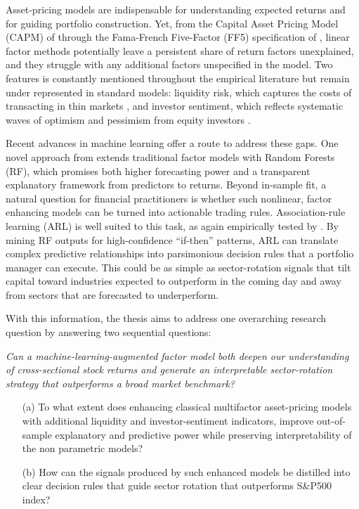 Asset-pricing models are indispensable for understanding expected returns and for guiding portfolio construction. Yet, from the Capital Asset Pricing Model (CAPM) of  through the Fama-French Five-Factor (FF5) specification of , linear factor methods potentially leave a persistent share of return factors unexplained, and they struggle with any additional factors unspecified in the model. Two features is constantly mentioned throughout the empirical literature but remain under represented in standard models: liquidity risk, which captures the costs of transacting in thin markets \cite{pastor_2003,acharya_2005}, and investor sentiment, which reflects systematic waves of optimism and pessimism from equity investors \cite{baker_wurgler_2006}.

Recent advances in machine learning offer a route to address these gaps. One novel approach from  extends traditional factor models with Random Forests (RF), which promises both higher forecasting power and a transparent explanatory framework from predictors to returns. Beyond in-sample fit, a natural question for financial practitioners is whether such nonlinear, factor enhancing models can be turned into actionable trading rules. Association-rule learning (ARL) is well suited to this task, as again empirically tested by . By mining RF outputs for high-confidence “if-then” patterns, ARL can translate complex predictive relationships into parsimonious decision rules that a portfolio manager can execute. This could be as simple as sector-rotation signals that tilt capital toward industries expected to outperform in the coming day and away from sectors that are forecasted to underperform.

\bigskip
\noindent
With this information, the thesis aims to address one overarching research question by answering two sequential questions:

\textit{Can a machine-learning-augmented factor model both deepen our understanding of cross-sectional stock returns and generate an interpretable sector-rotation strategy that outperforms a broad market benchmark?}

\begin{enumerate}
   \item[(a)] To what extent does enhancing classical multifactor asset-pricing models with additional liquidity and investor-sentiment indicators, improve out-of-sample explanatory and predictive power while preserving interpretability of the non parametric models?\\[4pt]
  \item[(b)] How can the signals produced by such enhanced models be distilled into clear decision rules that guide sector rotation that outperforms S\&P500 index?\\[4pt]
\end{enumerate}


